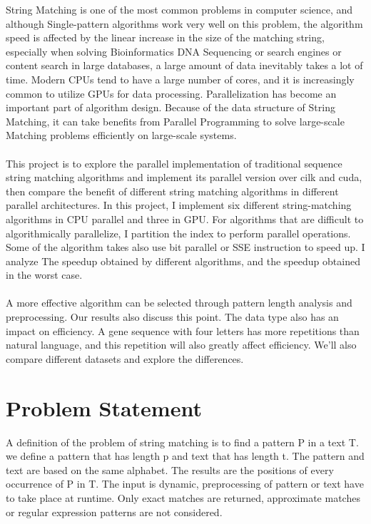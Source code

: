 \documentclass[11pt]{article}       %
\begin{document}
String Matching is one of the most common problems in computer science, and although Single-pattern algorithms work very well on this problem, the algorithm speed is affected by the linear increase in the size of the matching string, especially when solving Bioinformatics DNA Sequencing or search engines or content search in large databases, a large amount of data inevitably takes a lot of time. Modern CPUs tend to have a large number of cores, and it is increasingly common to utilize GPUs for data processing. Parallelization has become an important part of algorithm design. Because of the data structure of String Matching, it can take benefits  from Parallel Programming to solve large-scale Matching problems efficiently on large-scale systems.\\
\\This project is to explore the parallel implementation of traditional sequence string matching algorithms and implement its parallel version over cilk and cuda, then compare the benefit of different string matching algorithms in different parallel architectures. In this project, I implement six different string-matching algorithms in CPU parallel and three in GPU. For algorithms that are difficult to algorithmically parallelize, I partition the index to perform parallel operations. Some of the algorithm takes also use bit parallel or SSE instruction to speed up. I analyze The speedup obtained by different algorithms, and the speedup obtained in the worst case.\\ 
\\A more effective algorithm can be selected through pattern length analysis and preprocessing. Our results also discuss this point. The data type also has an impact on efficiency. A gene sequence with four letters has more repetitions than natural language, and this repetition will also greatly affect efficiency. We'll also compare different datasets and explore the differences.\\





\section{Problem Statement} \label{problemStatement}


A definition of the problem of string matching is to find a pattern P in a text T. we define a pattern that has length p and text that has length t. The pattern and text are based on the same alphabet. The results are the positions of every occurrence of P in T. The input is dynamic, preprocessing of pattern or text have to take place at runtime. Only exact matches are returned, approximate matches or regular expression patterns are not considered.
\end{document}
